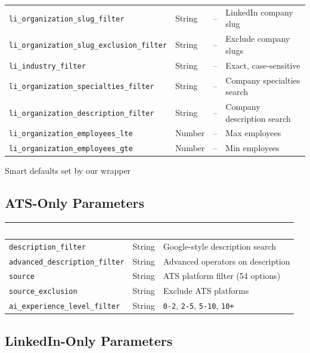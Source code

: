 \documentclass[11pt, a4paper]{article}
\begin{document}
{\begin{longtable}{|L{5.2cm}|C{1.2cm}|C{1.2cm}|L{7cm}|}
\texttt{li\_organization\_slug\_filter} & String & -- & LinkedIn company slug \\
\texttt{li\_organization\_slug\_exclusion\_filter} & String & -- & Exclude company slugs \\
\texttt{li\_industry\_filter} & String & -- & Exact, case-sensitive \\
\texttt{li\_organization\_specialties\_filter} & String & -- & Company specialties search \\
\texttt{li\_organization\_description\_filter} & String & -- & Company description search \\
\texttt{li\_organization\_employees\_lte} & Number & -- & Max employees \\
\texttt{li\_organization\_employees\_gte} & Number & -- & Min employees \\
\hline
\end{longtable}
}
{\small * Smart defaults set by our wrapper}

\subsection{ATS-Only Parameters}

\begin{center}\small
\begin{tabularx}{\textwidth}{|L{4.5cm}|C{1.5cm}|X|}
\hline
{}
\textcolor{white}{\textbf{Parameter}} & \textcolor{white}{\textbf{Type}} & \textcolor{white}{\textbf{Description}} \\
\hline
\texttt{description\_filter} & String & Google-style description search \\
\texttt{advanced\_description\_filter} & String & Advanced operators on description \\
\texttt{source} & String & ATS platform filter (54 options) \\
\texttt{source\_exclusion} & String & Exclude ATS platforms \\
\texttt{ai\_experience\_level\_filter} & String & \texttt{0-2}, \texttt{2-5}, \texttt{5-10}, \texttt{10+} \\
\hline
\end{tabularx}
\end{center}

\subsection{LinkedIn-Only Parameters}
\end{document}
